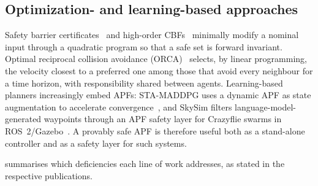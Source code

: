 \documentclass[11pt]{article}
\theoremstyle{definition}
\theoremstyle{remark}
\begin{document}
\subsection{Optimization- and learning-based approaches}
Safety barrier certificates~\cite{wang2017barrier} and high-order CBFs~\cite{xiao2022hocbf}
minimally modify a nominal input through a quadratic program so that a safe set
is forward invariant. Optimal reciprocal collision avoidance (ORCA)~\cite{vandenberg2011orca}
selects, by linear programming, the velocity closest to a preferred one among
those that avoid every neighbour for a time horizon, with responsibility shared
between agents. Learning-based planners increasingly embed APFs: STA-MADDPG
uses a dynamic APF as state augmentation to accelerate convergence~\cite{zhao2026stamaddpg},
and SkySim filters language-model-generated waypoints through an APF safety
layer for Crazyflie swarms in ROS~2/Gazebo~\cite{shibu2026skysim}. A provably
safe APF is therefore useful both as a stand-alone controller and as a safety
layer for such systems.

 summarises which deficiencies each line of work addresses,
as stated in the respective publications.
\end{document}
